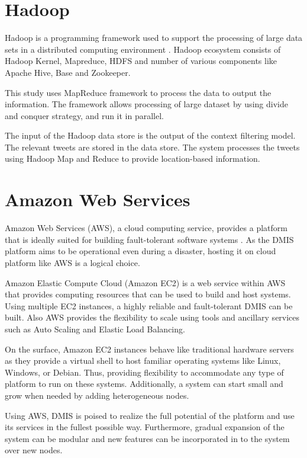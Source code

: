 \section{Hadoop}

Hadoop is a programming framework used to support the processing of large data sets in a distributed computing environment \cite{shvachko2010hadoop}. Hadoop ecosystem consists of Hadoop Kernel, Mapreduce, HDFS and number of various components like Apache Hive, Base and Zookeeper.

This study uses MapReduce framework to process the data to output the information. The framework allows processing of large dataset by using divide and conquer strategy, and run it in parallel.

The input of the Hadoop data store is the output of the context filtering model. The relevant tweets are stored in the data store. The system processes the tweets using Hadoop Map and Reduce to provide location-based information.

\section{Amazon Web Services}

Amazon Web Services (AWS), a cloud computing service, provides a platform that is ideally suited for building fault-tolerant software systems \cite{barr2011building}. As the DMIS platform aims to be operational even during a disaster, hosting it on cloud platform like AWS is a logical choice.

Amazon Elastic Compute Cloud (Amazon EC2) is a web service within AWS that provides computing resources that can be used to build and host systems. Using multiple EC2 instances, a highly reliable and fault-tolerant DMIS can be built. Also AWS provides the flexibility to scale using tools and ancillary services such as Auto Scaling and Elastic Load Balancing.

On the surface, Amazon EC2 instances behave like traditional hardware servers as they provide a virtual shell to host familiar operating systems like Linux, Windows, or Debian. Thus, providing flexibility to accommodate any type of platform to run on these systems. Additionally, a system can start small and grow when needed by adding heterogeneous nodes.

Using AWS, DMIS is poised to realize the full potential of the platform and use its services in the fullest possible way. Furthermore, gradual expansion of the system can be modular and new features can be incorporated in to the system over new nodes.

